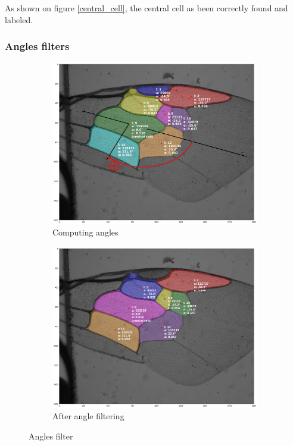 \documentclass[a4paper]{article}
\begin{document}
As shown on figure \ref{central_cell}, the central cell as been correctly found and labeled.


\subsubsection{Angles filters}

\begin{figure}[H]
\begin{subfigure}{.5\textwidth}
    \centering
    \includegraphics[width=\linewidth]{figures/angles2.png}
    \caption{Computing angles}
\end{subfigure}
\begin{subfigure}{.5\textwidth}
    \centering
    \includegraphics[width=\linewidth]{figures/filter_angle.png}
    \caption{After angle filtering}
\end{subfigure}
\caption{Angles filter}
\end{figure}
\end{document}
